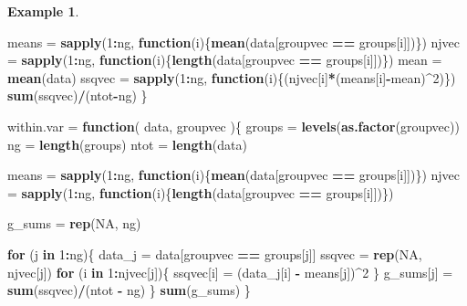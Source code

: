 \documentclass[
  openany]{book}
\newenvironment{Shaded}{\begin{snugshade}}{\end{snugshade}}
\newcommand{\ConstantTok}[1]{\textcolor[rgb]{0.56,0.35,0.01}{#1}}
\newcommand{\ControlFlowTok}[1]{\textcolor[rgb]{0.13,0.29,0.53}{\textbf{#1}}}
\newcommand{\DecValTok}[1]{\textcolor[rgb]{0.00,0.00,0.81}{#1}}
\newcommand{\FunctionTok}[1]{\textcolor[rgb]{0.13,0.29,0.53}{\textbf{#1}}}
\newcommand{\NormalTok}[1]{#1}
\newcommand{\OtherTok}[1]{\textcolor[rgb]{0.56,0.35,0.01}{#1}}
\newcommand{\SpecialCharTok}[1]{\textcolor[rgb]{0.81,0.36,0.00}{\textbf{#1}}}
\theoremstyle{definition}
\theoremstyle{definition}
\newtheorem{example}{Example}[chapter]
\theoremstyle{definition}
\theoremstyle{definition}
\theoremstyle{remark}
\begin{document}
\begin{example}
\begin{Shaded}
\begin{Highlighting}[]
  
\NormalTok{  means }\OtherTok{=} \FunctionTok{sapply}\NormalTok{(}\DecValTok{1}\SpecialCharTok{:}\NormalTok{ng, }\ControlFlowTok{function}\NormalTok{(i)\{}\FunctionTok{mean}\NormalTok{(data[groupvec }\SpecialCharTok{==}\NormalTok{ groups[i]])\})}
\NormalTok{  njvec }\OtherTok{=} \FunctionTok{sapply}\NormalTok{(}\DecValTok{1}\SpecialCharTok{:}\NormalTok{ng, }\ControlFlowTok{function}\NormalTok{(i)\{}\FunctionTok{length}\NormalTok{(data[groupvec }\SpecialCharTok{==}\NormalTok{ groups[i]])\})}
\NormalTok{  mean }\OtherTok{=} \FunctionTok{mean}\NormalTok{(data)}
\NormalTok{  ssqvec }\OtherTok{=} \FunctionTok{sapply}\NormalTok{(}\DecValTok{1}\SpecialCharTok{:}\NormalTok{ng, }\ControlFlowTok{function}\NormalTok{(i)\{(njvec[i]}\SpecialCharTok{*}\NormalTok{(means[i]}\SpecialCharTok{{-}}\NormalTok{mean)}\SpecialCharTok{\^{}}\DecValTok{2}\NormalTok{)\})}
  \FunctionTok{sum}\NormalTok{(ssqvec)}\SpecialCharTok{/}\NormalTok{(ntot}\SpecialCharTok{{-}}\NormalTok{ng)}
\NormalTok{\}}

\NormalTok{within.var }\OtherTok{=} \ControlFlowTok{function}\NormalTok{(}
\NormalTok{    data,}
\NormalTok{    groupvec}
\NormalTok{)\{}
\NormalTok{  groups }\OtherTok{=} \FunctionTok{levels}\NormalTok{(}\FunctionTok{as.factor}\NormalTok{(groupvec))}
\NormalTok{  ng }\OtherTok{=} \FunctionTok{length}\NormalTok{(groups)}
\NormalTok{  ntot }\OtherTok{=} \FunctionTok{length}\NormalTok{(data)}
  
\NormalTok{  means }\OtherTok{=} \FunctionTok{sapply}\NormalTok{(}\DecValTok{1}\SpecialCharTok{:}\NormalTok{ng, }\ControlFlowTok{function}\NormalTok{(i)\{}\FunctionTok{mean}\NormalTok{(data[groupvec }\SpecialCharTok{==}\NormalTok{ groups[i]])\})}
\NormalTok{  njvec }\OtherTok{=} \FunctionTok{sapply}\NormalTok{(}\DecValTok{1}\SpecialCharTok{:}\NormalTok{ng, }\ControlFlowTok{function}\NormalTok{(i)\{}\FunctionTok{length}\NormalTok{(data[groupvec }\SpecialCharTok{==}\NormalTok{ groups[i]])\})}


\NormalTok{  g\_sums }\OtherTok{=} \FunctionTok{rep}\NormalTok{(}\ConstantTok{NA}\NormalTok{, ng)}
  
  \ControlFlowTok{for}\NormalTok{ (j }\ControlFlowTok{in} \DecValTok{1}\SpecialCharTok{:}\NormalTok{ng)\{}
\NormalTok{    data\_j }\OtherTok{=}\NormalTok{ data[groupvec }\SpecialCharTok{==}\NormalTok{ groups[j]]}
\NormalTok{    ssqvec }\OtherTok{=} \FunctionTok{rep}\NormalTok{(}\ConstantTok{NA}\NormalTok{, njvec[j])}
    \ControlFlowTok{for}\NormalTok{ (i }\ControlFlowTok{in} \DecValTok{1}\SpecialCharTok{:}\NormalTok{njvec[j])\{}
\NormalTok{      ssqvec[i] }\OtherTok{=}\NormalTok{ (data\_j[i] }\SpecialCharTok{{-}}\NormalTok{ means[j])}\SpecialCharTok{\^{}}\DecValTok{2}
\NormalTok{    \}}
\NormalTok{    g\_sums[j] }\OtherTok{=} \FunctionTok{sum}\NormalTok{(ssqvec)}\SpecialCharTok{/}\NormalTok{(ntot }\SpecialCharTok{{-}}\NormalTok{ ng)}
\NormalTok{  \}}
  \FunctionTok{sum}\NormalTok{(g\_sums)}
\NormalTok{\}}


\end{Highlighting}
\end{Shaded}
\end{example}
\end{document}
